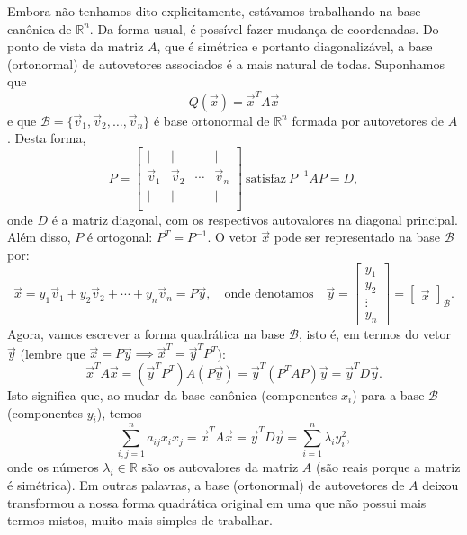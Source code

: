 Embora não tenhamos dito explicitamente, estávamos trabalhando na base canônica de $\mathbb{R}^n$. Da forma usual, é possível fazer mudança de coordenadas. Do ponto de vista da matriz $A$, que é simétrica e portanto diagonalizável, a base (ortonormal) de autovetores associados é a mais natural de todas. Suponhamos que
\begin{equation}
Q(\vec{x}) = \vec{x}^T A \vec{x}
\end{equation} e que $\mathcal{B} = \{ \vec{v}_1, \vec{v}_2, \dots, \vec{v}_n\}$ é base ortonormal de $\mathbb{R}^n$ formada por autovetores de $A$. Desta forma,
\begin{equation}
P =
\begin{bmatrix}
| & | &   & |  \\
\vec{v}_1 & \vec{v}_2 & \cdots & \vec{v}_n \\
| & | &   & |  \\
\end{bmatrix} \ \text{satisfaz} \ P^{-1}AP = D,
\end{equation} onde $D$ é a matriz diagonal, com os respectivos autovalores na diagonal principal. Além disso, $P$ é ortogonal: $P^T = P^{-1}$. O vetor $\vec{x}$ pode ser representado na base $\mathcal{B}$ por:
\begin{equation}
\vec{x} = y_1 \vec{v}_1 + y_2 \vec{v}_2 + \cdots + y_n \vec{v}_n = P\vec{y}, \quad \text{onde denotamos} \quad \vec{y} =
\begin{bmatrix}
y_1 \\ y_2 \\ \vdots \\ y_n
\end{bmatrix} =
\begin{bmatrix}
\vec{x}
\end{bmatrix}_{\mathcal{B}}.
\end{equation} Agora, vamos escrever a forma quadrática na base $\mathcal{B}$, isto é, em termos do vetor $\vec{y}$ (lembre que $\vec{x} = P \vec{y} \implies \vec{x}^T = \vec{y}^T P^T$):
\begin{equation}
\vec{x}^T A \vec{x} = (\vec{y}^T P^T) A (P \vec{y}) = \vec{y}^T (P^T A P) \vec{y} = \vec{y}^T D \vec{y}.
\end{equation} Isto significa que, ao mudar da base canônica (componentes $x_i$) para a base $\mathcal{B}$ (componentes $y_i$), temos
\begin{equation}
\sum_{i,j=1}^{n} a_{ij} x_i x_j = \vec{x}^T A \vec{x} = \vec{y}^T D \vec{y} = \sum_{i=1}^{n} \lambda_i y_i^2,
\end{equation} onde os números $\lambda_i \in \mathbb{R}$ são os autovalores da matriz $A$ (são reais porque a matriz é simétrica). Em outras palavras, a base (ortonormal) de autovetores de $A$ deixou transformou a nossa forma quadrática original em uma que não possui mais termos mistos, muito mais simples de trabalhar.



